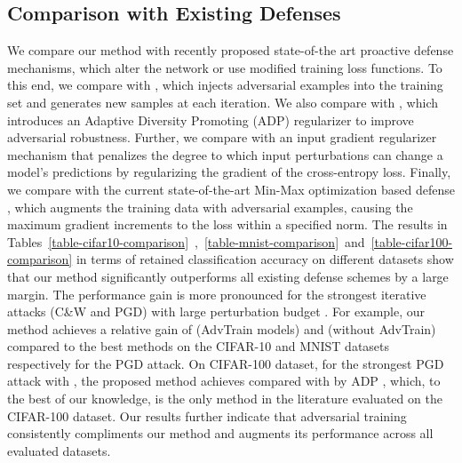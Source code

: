 \documentclass[10pt,twocolumn,letterpaper]{article}
\begin{document}
\subsection{Comparison with Existing Defenses}
\label{subsec:comparison}
\vspace{-0.5em}

We compare our method with recently proposed state-of-the art proactive defense mechanisms, which alter the network or use modified training loss functions. To this end, we compare with \cite{kurakin2016adversarial_2}, which injects adversarial examples into the training set and generates new samples at each iteration. We also compare with \cite{pang2019improving}, which introduces an Adaptive Diversity Promoting (ADP) regularizer to improve adversarial robustness. Further, we compare with an input gradient regularizer mechanism \cite{ross2018improving} that penalizes the degree to which input perturbations can change a model's predictions by regularizing the gradient of the cross-entropy loss. Finally, we compare with the current state-of-the-art Min-Max optimization based defense \cite{madry2017towards}, which augments the training data with adversarial examples, causing the maximum gradient increments to the loss within a specified  norm.
The results in Tables~\ref{table-cifar10-comparison}~,~\ref{table-mnist-comparison}~and~\ref{table-cifar100-comparison} in terms of retained classification accuracy on different datasets show that our method significantly outperforms all existing defense schemes by a large margin. The performance gain is more pronounced for the strongest iterative attacks (\eg C\&W and PGD) with large perturbation budget . For example, our method achieves a relative gain of  (AdvTrain models) and  (without AdvTrain) compared to the  best methods on the CIFAR-10 and MNIST datasets respectively for the PGD attack.
On CIFAR-100 dataset, for the strongest PGD attack with , the proposed method achieves  compared with  by ADP \cite{pang2019improving}, which, to the best of our knowledge, is the only method in the literature evaluated on the CIFAR-100 dataset. Our results further indicate that adversarial training consistently compliments our method and augments its performance across all evaluated datasets.
\end{document}

